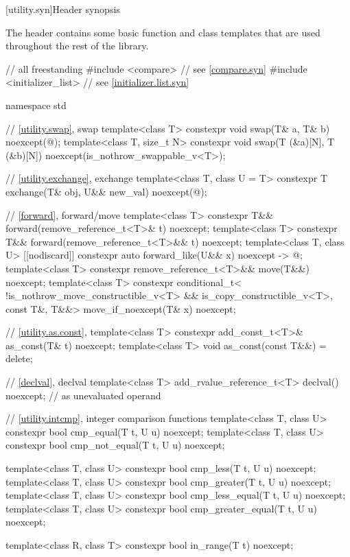[utility.syn]{Header  synopsis}

\pnum
The header 
contains some basic function and class templates that are used
throughout the rest of the library.

\begin{codeblock}
// all freestanding
#include <compare>              // see \ref{compare.syn}
#include <initializer_list>     // see \ref{initializer.list.syn}

namespace std {
  // \ref{utility.swap}, swap
  template<class T>
    constexpr void swap(T& a, T& b) noexcept(@\seebelow@);
  template<class T, size_t N>
    constexpr void swap(T (&a)[N], T (&b)[N]) noexcept(is_nothrow_swappable_v<T>);

  // \ref{utility.exchange}, exchange
  template<class T, class U = T>
    constexpr T exchange(T& obj, U&& new_val) noexcept(@\seebelow@);

  // \ref{forward}, forward/move
  template<class T>
    constexpr T&& forward(remove_reference_t<T>& t) noexcept;
  template<class T>
    constexpr T&& forward(remove_reference_t<T>&& t) noexcept;
  template<class T, class U>
    [[nodiscard]] constexpr auto forward_like(U&& x) noexcept -> @\seebelow@;
  template<class T>
    constexpr remove_reference_t<T>&& move(T&&) noexcept;
  template<class T>
    constexpr conditional_t<
        !is_nothrow_move_constructible_v<T> && is_copy_constructible_v<T>, const T&, T&&>
      move_if_noexcept(T& x) noexcept;

  // \ref{utility.as.const}, 
  template<class T>
    constexpr add_const_t<T>& as_const(T& t) noexcept;
  template<class T>
    void as_const(const T&&) = delete;

  // \ref{declval}, declval
  template<class T>
    add_rvalue_reference_t<T> declval() noexcept;   // as unevaluated operand

  // \ref{utility.intcmp}, integer comparison functions
  template<class T, class U>
    constexpr bool cmp_equal(T t, U u) noexcept;
  template<class T, class U>
    constexpr bool cmp_not_equal(T t, U u) noexcept;

  template<class T, class U>
    constexpr bool cmp_less(T t, U u) noexcept;
  template<class T, class U>
    constexpr bool cmp_greater(T t, U u) noexcept;
  template<class T, class U>
    constexpr bool cmp_less_equal(T t, U u) noexcept;
  template<class T, class U>
    constexpr bool cmp_greater_equal(T t, U u) noexcept;

  template<class R, class T>
    constexpr bool in_range(T t) noexcept;

}
\end{codeblock}
